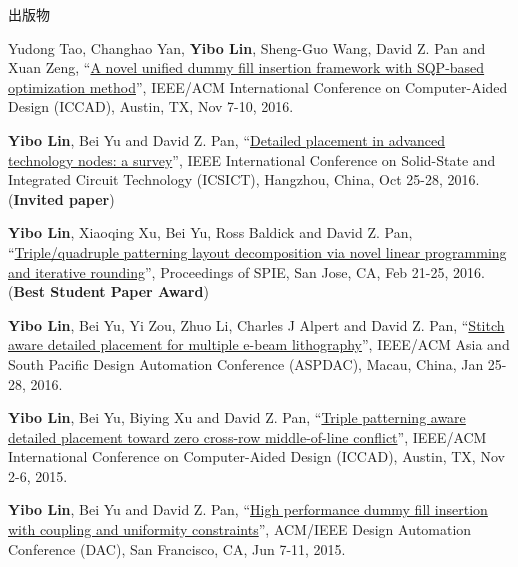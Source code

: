 \begin{rSection}{出版物}
\begin{description}[font=\normalfont, rightmargin=2em]
{}
            

\item[{[C7]}]{
        Yudong Tao, Changhao Yan, \textbf{Yibo Lin}, Sheng-Guo Wang, David Z. Pan and Xuan Zeng, 
    ``\href{http://dx.doi.org/10.1145/2966986.2966994}{A novel unified dummy fill insertion framework with SQP-based optimization method}'', 
    IEEE/ACM International Conference on Computer-Aided Design (ICCAD), Austin, TX, Nov 7-10, 2016.
    
}
            

\item[{[C6]}]{
        \textbf{Yibo Lin}, Bei Yu and David Z. Pan, 
    ``\href{https://doi.org/10.1109/ICSICT.2016.7999056}{Detailed placement in advanced technology nodes: a survey}'', 
    IEEE International Conference on Solid-State and Integrated Circuit Technology (ICSICT), Hangzhou, China, Oct 25-28, 2016.
    (\textbf{Invited paper})
}
            

\item[{[C5]}]{
        \textbf{Yibo Lin}, Xiaoqing Xu, Bei Yu, Ross Baldick and David Z. Pan, 
    ``\href{http://dx.doi.org/10.1117/12.2218628}{Triple/quadruple patterning layout decomposition via novel linear programming and iterative rounding}'', 
    Proceedings of SPIE, San Jose, CA, Feb 21-25, 2016.
    (\textbf{Best Student Paper Award})
}
            

\item[{[C4]}]{
        \textbf{Yibo Lin}, Bei Yu, Yi Zou, Zhuo Li, Charles J Alpert and David Z. Pan, 
    ``\href{http://ieeexplore.ieee.org/xpl/articleDetails.jsp?arnumber=7428009}{Stitch aware detailed placement for multiple e-beam lithography}'', 
    IEEE/ACM Asia and South Pacific Design Automation Conference (ASPDAC), Macau, China, Jan 25-28, 2016.
    
}
            

\item[{[C3]}]{
        \textbf{Yibo Lin}, Bei Yu, Biying Xu and David Z. Pan, 
    ``\href{http://dl.acm.org/citation.cfm?id=2840875}{Triple patterning aware detailed placement toward zero cross-row middle-of-line conflict}'', 
    IEEE/ACM International Conference on Computer-Aided Design (ICCAD), Austin, TX, Nov 2-6, 2015.
    
}
            

\item[{[C2]}]{
        \textbf{Yibo Lin}, Bei Yu and David Z. Pan, 
    ``\href{http://dl.acm.org/citation.cfm?id=2744769.2744850}{High performance dummy fill insertion with coupling and uniformity constraints}'', 
    ACM/IEEE Design Automation Conference (DAC), San Francisco, CA, Jun 7-11, 2015.
    
}
\end{description}
\end{rSection}
